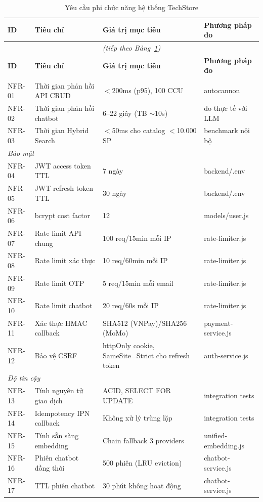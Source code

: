 {\footnotesize
\begin{longtable}{|l|p{4.5cm}|p{4.2cm}|p{3.3cm}|}
  \caption{Yêu cầu phi chức năng hệ thống TechStore}
  \label{tab:nfr} \\
  \hline
  \textbf{ID} & \textbf{Tiêu chí} & \textbf{Giá trị mục tiêu} & \textbf{Phương pháp đo} \\
  \hline
  \endfirsthead
  \multicolumn{4}{c}{\textit{(tiếp theo Bảng~\ref{tab:nfr})}} \\
  \hline
  \textbf{ID} & \textbf{Tiêu chí} & \textbf{Giá trị mục tiêu} & \textbf{Phương pháp đo} \\
  \hline
  \endhead
  \hline
  \endfoot

  \multicolumn{4}{|l|}{\textit{Hiệu năng}} \\
  \hline
  NFR-01 & Thời gian phản hồi API CRUD & $<$200ms (p95), 100 CCU & autocannon \\
  \hline
  NFR-02 & Thời gian phản hồi chatbot & 6--22 giây (TB $\sim$10s) & đo thực tế với LLM \\
  \hline
  NFR-03 & Thời gian Hybrid Search & $<$50ms cho catalog $<$10.000 SP & benchmark nội bộ \\
  \hline

  \multicolumn{4}{|l|}{\textit{Bảo mật}} \\
  \hline
  NFR-04 & JWT access token TTL & 7 ngày & backend/.env \\
  \hline
  NFR-05 & JWT refresh token TTL & 30 ngày & backend/.env \\
  \hline
  NFR-06 & bcrypt cost factor & 12 & models/user.js \\
  \hline
  NFR-07 & Rate limit API chung & 100 req/15min mỗi IP & rate-limiter.js \\
  \hline
  NFR-08 & Rate limit xác thực & 10 req/60min mỗi IP & rate-limiter.js \\
  \hline
  NFR-09 & Rate limit OTP & 5 req/15min mỗi email & rate-limiter.js \\
  \hline
  NFR-10 & Rate limit chatbot & 20 req/60s mỗi IP & rate-limiter.js \\
  \hline
  NFR-11 & Xác thực HMAC callback & SHA512 (VNPay)\slash SHA256 (MoMo) & payment-service.js \\
  \hline
  NFR-12 & Bảo vệ CSRF & httpOnly cookie, SameSite=Strict cho refresh token & auth-service.js \\
  \hline

  \multicolumn{4}{|l|}{\textit{Độ tin cậy}} \\
  \hline
  NFR-13 & Tính nguyên tử giao dịch & ACID, SELECT FOR UPDATE & integration tests \\
  \hline
  NFR-14 & Idempotency IPN callback & Không xử lý trùng lặp & integration tests \\
  \hline
  NFR-15 & Tính sẵn sàng embedding & Chain fallback 3 providers & unified-embedding.js \\
  \hline
  NFR-16 & Phiên chatbot đồng thời & 500 phiên (LRU eviction) & chatbot-service.js \\
  \hline
  NFR-17 & TTL phiên chatbot & 30 phút không hoạt động & chatbot-service.js \\
  \hline


\end{longtable}}
